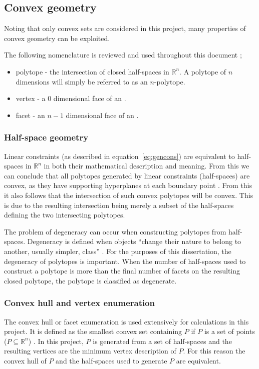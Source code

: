 \subsection{Convex geometry}
Noting that only convex sets are considered in this project, many properties of convex geometry can be exploited.

The following nomenclature is reviewed and used throughout this document \citep[487]{bayerlee};
\begin{itemize}
\item polytope - the intersection of closed half-spaces in $\mathbb{R}^n$.
A polytope of $n$ dimensions will simply be referred to as an $n$-polytope.
\item vertex - a 0 dimensional face of an \npoly.
\item facet - an $n-1$ dimensional face of an \npoly.
\end{itemize}

\subsubsection{Half-space geometry}\label{sec:hgeometry}
Linear constraints (as described in equation~\ref{eq:gencons}) are equivalent to half-spaces in $\mathbb{R}^n$ in both their mathematical description and meaning.
From this we can conclude that all polytopes generated by linear constraints (half-spaces) are convex, as they have supporting hyperplanes at each boundary point \citep[21]{manilev}.
From this it also follows that the intersection of such convex polytopes will be convex.
This is due to the resulting intersection being merely a subset of the half-spaces defining the two intersecting polytopes.

The problem of degeneracy can occur when constructing polytopes from half-spaces.
Degeneracy is defined when objects ``change their nature to belong to another, usually simpler, class'' \citep[688]{crcmaths}.
For the purposes of this dissertation, the degeneracy of polytopes is important.
When the number of half-spaces used to construct a polytope is more than the final number of facets on the resulting closed polytope, the polytope is classified as degenerate.

\subsubsection{Convex hull and vertex enumeration}
The convex hull or facet enumeration is used extensively for calculations in this project.
It is defined as the smallest convex set containing $P$ if $P$ is a set of points ($P \subseteq \mathbb{R}^n$) \citep[74]{wenger}.
In this project, $P$ is generated from a set of half-spaces and the resulting vertices are the minimum vertex description of $P$.
For this reason the convex hull of $P$ and the half-spaces used to generate $P$ are equivalent.


